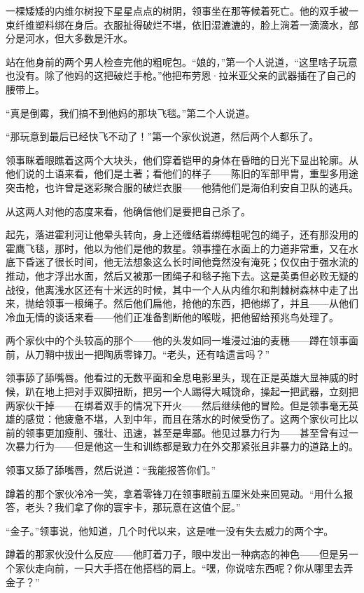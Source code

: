 \documentclass[AutoFakeBold=true]{book}
\begin{document}
\vspace*{1em}

一棵矮矮的内维尔树投下星星点点的树阴，领事坐在那等候着死亡。他的双手被一束纤维塑料绑在身后。衣服扯得破烂不堪，依旧湿漉漉的，脸上淌着一滴滴水，部分是河水，但大多数是汗水。

站在他身前的两个男人检查完他的粗呢包。``娘的，''第一个人说道，``这里啥子玩意也没有。除了他妈的这把破烂手枪。''他把布劳恩·拉米亚父亲的武器插在了自己的腰带上。

``真是倒霉，我们搞不到他妈的那块飞毯。''第二个人说道。

``那玩意到最后已经快飞不动了！''第一个家伙说道，然后两个人都乐了。

领事眯着眼瞧着这两个大块头，他们穿着铠甲的身体在昏暗的日光下显出轮廓。从他们说的土语来看，他们是土著；看他们的样子——陈旧的军部甲胄，重型多用途突击枪，也许曾是迷彩聚合服的破烂衣服——他猜他们是海伯利安自卫队的逃兵。

从这两人对他的态度来看，他确信他们是要把自己杀了。

起先，落进霍利河让他晕头转向，身上还缠结着绑缚粗呢包的绳子，还有那没用的霍鹰飞毯，那时，他以为他们是他的救星。领事撞在水面上的力道非常重，又在水底下昏迷了很长时间，他无法想象这么长时间他竟然没有淹死；仅仅由于强水流的推动，他才浮出水面，然后又被那一团绳子和毯子拖下去。这是英勇但必败无疑的战役，他离浅水区还有十米远的时候，其中一个人从内维尔和荆棘树森林中走了出来，抛给领事一根绳子。然后他们扁他，抢他的东西，把他绑了，并且——从他们冷血无情的谈话来看——他们正准备割断他的喉咙，把他留给预兆鸟处理了。

两个家伙中的个头较高的那个——他的头发如同一堆浸过油的麦穗——蹲在领事面前，从刀鞘中拔出一把陶质零锋刀。``老头，还有啥遗言吗？''

领事舔了舔嘴唇。他看过的无数平面和全息电影里头，现在正是英雄大显神威的时候，趴在地上把对手双脚扭断，把另一个人踢得大喊饶命，操起一把武器，立刻把两家伙干掉——在绑着双手的情况下开火——然后继续他的冒险。但是领事毫无英雄的感觉：他疲惫不堪，人到中年，而且在落水的时候受伤了。这两个家伙可比以前的领事更加瘦削、强壮、迅速，甚至是卑鄙。他见过暴力行为——甚至曾有过一次暴力行为——但是他这一生和训练都是致力在外交那紧张且非暴力的道路上的。

领事又舔了舔嘴唇，然后说道：``我能报答你们。''

蹲着的那个家伙冷冷一笑，拿着零锋刀在领事眼前五厘米处来回晃动。``用什么报答，老头？我们拿了你的寰宇卡，那玩意在这值个屁。''

``金子。''领事说，他知道，几个时代以来，这是唯一没有失去威力的两个字。

蹲着的那家伙没什么反应——他盯着刀子，眼中发出一种病态的神色——但是另一个家伙走向前，一只大手搭在他搭档的肩上。``嘿，你说啥东西呢？你从哪里去弄金子？''
\end{document}
